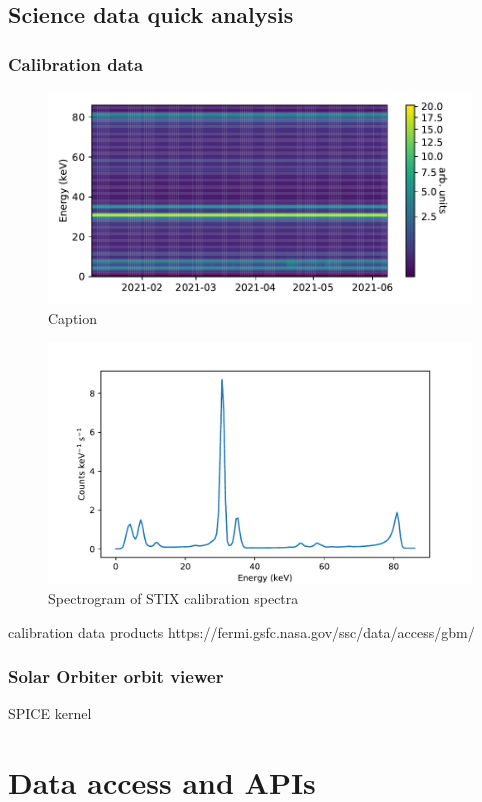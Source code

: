 \documentclass{aa}
\begin{document}
\subsection{Science data quick analysis}
\subsubsection{Calibration data}
\begin{figure}
    \centering
    \includegraphics[width=0.8\linewidth]{figures/calibrationSpectrogram.pdf}
    \caption{Caption}
    \label{fig:calibrationSpectrum}
\end{figure}
\begin{figure}
    \centering
    \includegraphics[width=0.8\linewidth]{figures/calibrationSpectrum.pdf}
    \caption{Spectrogram of STIX calibration spectra}
    \label{fig:calibrationSpectrogram}
\end{figure}

calibration data products
https://fermi.gsfc.nasa.gov/ssc/data/access/gbm/
\subsubsection{Solar Orbiter orbit viewer}
SPICE kernel
\section{Data access and APIs}
\end{document}
